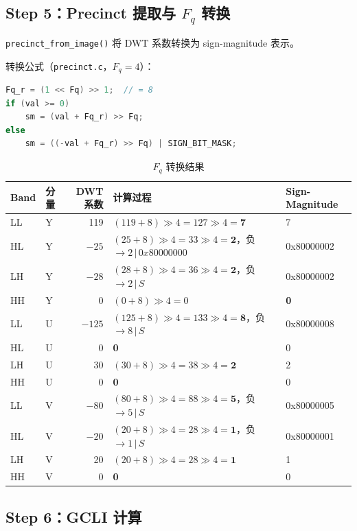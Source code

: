 \subsection{Step 5：Precinct 提取与 $F_q$ 转换}

\texttt{precinct\_from\_image()} 将 DWT 系数转换为 sign-magnitude 表示。

转换公式（\texttt{precinct.c}，$F_q = 4$）：
\begin{lstlisting}[language=C,numbers=none]
Fq_r = (1 << Fq) >> 1;  // = 8
if (val >= 0)
    sm = (val + Fq_r) >> Fq;
else
    sm = ((-val + Fq_r) >> Fq) | SIGN_BIT_MASK;
\end{lstlisting}

\begin{table}[H]
\centering
\caption{$F_q$ 转换结果}
\label{tab:e2e-fq}
\begin{tabular}{@{}llrll@{}}
\toprule
Band & 分量 & DWT 系数 & 计算过程 & Sign-Magnitude \\
\midrule
LL & Y & 119  & $(119+8)\gg4 = 127\gg4 = \mathbf{7}$   & 7 \\
HL & Y & $-25$ & $(25+8)\gg4 = 33\gg4 = \mathbf{2}$，负 $\to 2\,|\,0x80000000$ & 0x80000002 \\
LH & Y & $-28$ & $(28+8)\gg4 = 36\gg4 = \mathbf{2}$，负 $\to 2\,|\,S$ & 0x80000002 \\
HH & Y & 0    & $(0+8)\gg4 = 0$ & \textbf{0} \\
LL & U & $-125$ & $(125+8)\gg4 = 133\gg4 = \mathbf{8}$，负 $\to 8\,|\,S$ & 0x80000008 \\
HL & U & 0    & \textbf{0} & 0 \\
LH & U & 30   & $(30+8)\gg4 = 38\gg4 = \mathbf{2}$ & 2 \\
HH & U & 0    & \textbf{0} & 0 \\
LL & V & $-80$ & $(80+8)\gg4 = 88\gg4 = \mathbf{5}$，负 $\to 5\,|\,S$ & 0x80000005 \\
HL & V & $-20$ & $(20+8)\gg4 = 28\gg4 = \mathbf{1}$，负 $\to 1\,|\,S$ & 0x80000001 \\
LH & V & 20   & $(20+8)\gg4 = 28\gg4 = \mathbf{1}$ & 1 \\
HH & V & 0    & \textbf{0} & 0 \\
\bottomrule
\end{tabular}
\end{table}

\subsection{Step 6：GCLI 计算}

